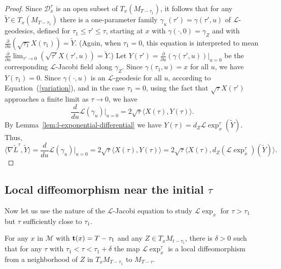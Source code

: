 \begin{proof}
\sketch
{}
Since ${\mathcal D}^{\tau}_x$ is an open subset of $T_x(M_{T-\tau_1})$, it
follows that for any $\widetilde Y\in T_x(M_{T-\tau_1})$ there is a
one-parameter family $\gamma_u(\tau')=\gamma(\tau',u)$ of
 ${\mathcal L}$-geodesics, defined for $\tau_1\le \tau'\le \tau$,
starting at $x$ with $\gamma(\cdot,0)=\gamma_Z$ and with
$\frac{\partial}{\partial u}\left(\sqrt{\tau_1}X(\tau_1)\right)=\widetilde Y$.
(Again, when $\tau_1=0$, this equation is interpreted to mean
$\frac{\partial}{\partial u}\lim_{\tau'\rightarrow
0}(\sqrt{\tau'}X(\tau',u))=\widetilde Y$.) Let
$Y(\tau')=\frac{\partial}{\partial u}(\gamma(\tau',u))|_{u=0}$ be the
corresponding ${\mathcal L}$-Jacobi field along $\gamma_Z$. Since
$\gamma(\tau_1,u)=x$ for all $u$, we have $Y(\tau_1)=0$. Since
$\gamma(\cdot,u)$ is an ${\mathcal L}$-geodesic for all $u$, according to
Equation~(\ref{variation}), and in the case $\tau_1=0$, using the fact that
$\sqrt{\tau}X(\tau')$ approaches a finite limit as $\tau\rightarrow 0$, we have
$$\frac{d}{du}{\mathcal
L}(\gamma_u)|_{u=0}=2\sqrt{\tau}\langle X(\tau),Y(\tau)\rangle.$$ By
Lemma~\ref{lem:l-exponential-differential} we have $Y(\tau)=d_Z{\mathcal L}\exp_x^{\tau}(\tilde
Y)$. Thus,
$$\langle\nabla\widetilde L^{\tau},\widetilde Y\rangle=\frac{d}{du}{\mathcal
L}(\gamma_u)|_{u=0}=2\sqrt{\tau}\langle
X(\tau),Y(\tau)\rangle=2\sqrt{\tau}\langle X(\tau),d_Z({\mathcal
L}\exp^{\tau}_x)(\widetilde Y)\rangle.$$
\end{proof}


\subsection{Local diffeomorphism near the initial $\tau$}

Now let us use the nature of the ${\mathcal L}$-Jacobi equation to
study ${\mathcal L}\exp_x$ for $\tau>\tau_1$ but $\tau$
sufficiently close to $\tau_1$.

\begin{lemma}\label{lem:l-exponential-local-diffeomorphism}
\label{locstr}
For any $x$ in ${\mathcal M}$ with ${\bf
t}(x)=T-\tau_1$ and any $Z\in T_xM_{t-\tau_1}$, there is $\delta>0$
such that for any $\tau$ with $\tau_1<\tau<\tau_1+\delta$ the map
${\mathcal L}\exp_x^{\tau}$ is a local diffeomorphism from a
neighborhood of $Z$ in $T_xM_{T-\tau_1}$ to $M_{T-\tau}$.
\end{lemma}

